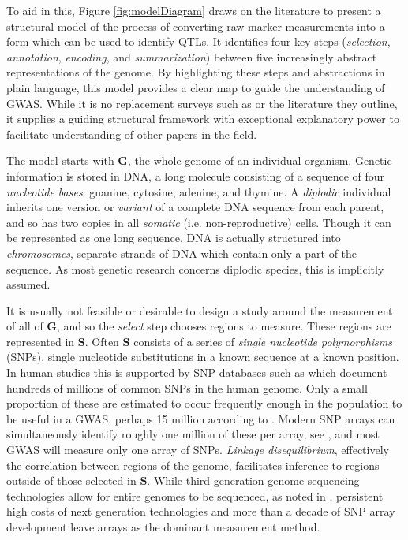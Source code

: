 \documentclass{article}
\newcommand{\m}[1]{\mathbf{#1}}               %
\begin{document}
To aid in this, Figure \ref{fig:modelDiagram} draws on the literature to present a structural model of the process of converting raw marker measurements into a form which can be used to identify QTLs. It identifies four key steps (\emph{selection}, \emph{annotation}, \emph{encoding}, and \emph{summarization}) between five increasingly abstract representations of the genome. By highlighting these steps and abstractions in plain language, this model provides a clear map to guide the understanding of GWAS. While it is no replacement surveys such as \cite{uffelmannetal2021gwas, tametal2019benefits} or the literature they outline, it supplies a guiding structural framework with exceptional explanatory power to facilitate understanding of other papers in the field.

The model starts with $\m{G}$, the whole genome of an individual organism. Genetic information is stored in DNA, a long molecule consisting of a sequence of four \emph{nucleotide bases}: guanine, cytosine, adenine, and thymine. A \emph{diplodic} individual inherits one version or \emph{variant} of a complete DNA sequence from each parent, and so has two copies in all \emph{somatic} (i.e. non-reproductive) cells. Though it can be represented as one long sequence, DNA is actually structured into \emph{chromosomes}, separate strands of DNA which contain only a part of the sequence. As most genetic research concerns diplodic species, this is implicitly assumed.

It is usually not feasible or desirable to design a study around the measurement of all of $\m{G}$, and so the \emph{select} step chooses regions to measure. These regions are represented in $\m{S}$. Often $\m{S}$ consists of a series of \emph{single nucleotide polymorphisms} (SNPs), single nucleotide substitutions in a known sequence at a known position. In human studies this is supported by SNP databases such as \cite{NCBIdbSNP} which document hundreds of millions of common SNPs in the human genome. Only a small proportion of these are estimated to occur frequently enough in the population to be useful in a GWAS, perhaps 15 million according to \cite{koboldtetal2013next}. Modern SNP arrays can simultaneously identify roughly one million of these per array, see \cite{laframboise2009, tametal2019benefits}, and most GWAS will measure only one array of SNPs. \emph{Linkage disequilibrium}, effectively the correlation between regions of the genome, facilitates inference to regions outside of those selected in $\m{S}$. While third generation genome sequencing technologies allow for entire genomes to be sequenced, as noted in \cite{heatherchain2016sequencers, hasinetal2017multi, uffelmannetal2021gwas}, persistent high costs of next generation technologies and more than a decade of SNP array development leave arrays as the dominant measurement method.
\end{document}
